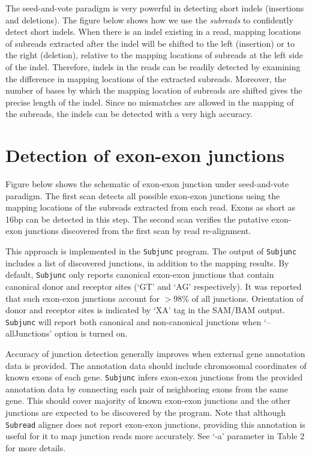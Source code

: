 \documentclass[12pt]{report}
\newcommand{\code}[1]{{\small\texttt{#1}}}
\begin{document}
The seed-and-vote paradigm is very powerful in detecting short indels (insertions and deletions).
The figure below shows how we use the \emph{subreads} to confidently detect short indels.
When there is an indel existing in a read, mapping locations of subreads extracted after the indel will be shifted to the left (insertion) or to the right (deletion), relative to the mapping locations of subreads at the left side of the indel.
Therefore, indels in the reads can be readily detected by examining the difference in mapping locations of the extracted subreads.
Moreover, the number of bases by which the mapping location of subreads are shifted gives the precise length of the indel.
Since no mismatches are allowed in the mapping of the subreads, the indels can be detected with a very high accuracy.


\section{Detection of exon-exon junctions}
\label{sec:junction}

Figure below shows the schematic of exon-exon junction under seed-and-vote paradigm.
The first scan detects all possible exon-exon junctions using the mapping locations of the subreads extracted from each read.
Exons as short as 16bp can be detected in this step.
The second scan verifies the putative exon-exon junctions discovered from the first scan by read re-alignment.

This approach is implemented in the \code{Subjunc} program.
The output of \code{Subjunc} includes a list of discovered junctions, in addition to the mapping results.
By default, \code{Subjunc} only reports canonical exon-exon junctions that contain canonical donor and receptor sites (`GT' and `AG' respectively).
It was reported that such exon-exon junctions account for $>$98\% of all junctions.
Orientation of donor and receptor sites is indicated by `XA' tag in the SAM/BAM output.
\code{Subjunc} will report both canonical and non-canonical junctions when `--allJunctions' option is turned on.

Accuracy of junction detection generally improves when external gene annotation data is provided.
The annotation data should include chromosomal coordinates of known exons of each gene.
\code{Subjunc} infers exon-exon junctions from the provided annotation data by connecting each pair of neighboring exons from the same gene.
This should cover majority of known exon-exon junctions and the other junctions are expected to be discovered by the program.
Note that although \code{Subread} aligner does not report exon-exon junctions, providing this annotation is useful for it to map junction reads more accurately.
See `-a' parameter in Table 2 for more details.
\end{document}
